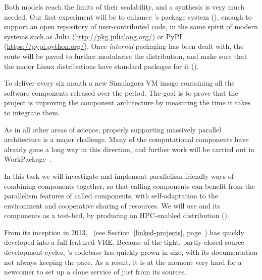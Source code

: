 \begin{workpackage}[id=component-architecture,wphases=0-48!.5,
  title=Component Architecture,lead=UV,
  PSRM=50,UVRM=8,SARM=16, USORM=6, UORM=4, LLRM=14, UJFRM=6, UGRM=14]
\begin{tasklist}
\begin{task}[title=Modularisation and packaging,id=mod-packaging,lead=UV,PM=20,partners={PS,LL,UG},wphases=0-48]
    Both models reach the limits of their scalability, and a synthesis
    is very much needed.  Our first experiment will be to enhance
    \Sage's package system
    (), enough to
    support an open repository of user-contributed code, in the same
    spirit of modern systems such as Julia
    (\url{http://pkg.julialang.org/}) or PyPI
    (\url{https://pypi.python.org/}).  Once \emph{internal} packaging
    has been dealt with, the route will be paved to further modularise
    the \Sage distribution, and make sure that the major Linux
    distributions have standard packages for it
    ().

  \end{task}

\begin{task}[id=simulagora-dev,title=Simulagora integration,PM=4,lead=LL,wphases=0-48]
  To deliver every six month a new Simulagora VM image containing all the software
  components released over the period. The goal is to prove that the project is
  improving the component architecture by measuring the time it takes to
  integrate them.
\end{task}


  \begin{task}[title=Component architecture for High Performance Computing and Parallelism,id=component-for-HPC,PM=12,wphases=36-48,lead=UJF,partners=SA]
    As in all other areas of science, properly supporting massively
    parallel architecture is a major challenge. Many of the
    computational components have already gone a long way in this
    direction, and further work will be carried out in
    WorkPackage~.

    In this task we will investigate and implement
    parallelism-friendly ways of combining components together, so
    that calling components can benefit from the parallelism features
    of called components, with self-adaptation to the environment and
    cooperative sharing of resources. We will use \Sage and its
    components as a test-bed, by producing an HPC-enabled distribution
    ().
  \end{task}

  \begin{task}[title=Document and modularise \SMC's codebase,id=extract-smc,lead=PS,PM=10,partners={UV,UG},wphases=0-24]
    From its inception in 2013, \SMC\ (see Section~\ref{linked-projects}, page~\pageref{sec:SMC-page}) 
    has quickly developed into a full
    featured VRE.  Because of the tight, partly closed source
    development cycles, \SMC's codebase has quickly grown in size,
    with its documentation not always keeping the pace. As a result,
    it is at the moment very hard for a newcomer to set up a clone
    service of \SMC just from its sources.


\end{task}
\end{tasklist}
\end{workpackage}

